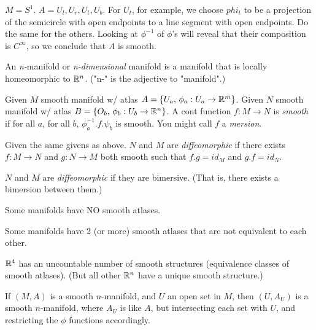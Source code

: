 \documentclass[11pt,leqno,oneside]{amsart}
\begin{document}
\begin{example}
	$M = S^1$.  $A = {U_l, U_r, U_t, U_b}$.  For $U_t$, for example, we choose $phi_t$ to be a projection of the semicircle with open endpoints to a line segment with open endpoints.  Do the same for the others.  Looking at $\phi^{-1}$ of $\phi$'s will reveal that their composition is $C^\infty$, so we conclude that $A$ is smooth.
\end{example}

\begin{defn}
	An \emph{n-}manifold or \emph{n-dimensional} manifold is a manifold that is locally homeomorphic to ${\mathbb R}^n$.  ("n-" is the adjective to "manifold".)
\end{defn}


\begin{defn}
	Given $M$ smooth manifold w/ atlas $A = \{ U_a, \,  \phi_a : U_a \to {\mathbb R}^m \}$.
	Given $N$ smooth manifold w/ atlas $B = \{ O_b, \,  \phi_b : U_b \to {\mathbb R}^n \}$.
	A cont function $f : M \to N$ is \emph{smooth} if for all $a$, for all $b$, $\phi_a^{-1}.f.\psi_b$ is smooth.  You might call $f$ a \emph{mersion}.
\end{defn}
\begin{defn}
	Given the same givens as above.
	$N$ and $M$ are \emph{diffeomorphic} if there exists $f : M \to N$ and $g : N \to M$ both smooth such that $f.g = id_M$ and $g.f = id_N$.
\end{defn}
\begin{defn}
	$N$ and $M$ are \emph{diffeomorphic} if they are bimersive.  (That is, there exists a bimersion between them.)
\end{defn}

\begin{rmk}
	Some manifolds have NO smooth atlases.

	Some manifolds have 2 (or more) smooth atlases that are not equivalent to each other.
\end{rmk}


\begin{thm}
	${\mathbb R}^4$ has an uncountable number of smooth structures (equivalence classes of smooth atlases).  (But all other ${\mathbb R}^n$ have a unique smooth structure.)
\end{thm}

\begin{rmk}
	If $(M,A)$ is a smooth $n$-manifold, and $U$ an open set in $M$, then $(U,A_U)$ is a smooth $n$-manifold, where $A_U$ is like $A$, but intersecting each set with $U$, and restricting the $\phi$ functions accordingly.
\end{rmk}
\end{document}
